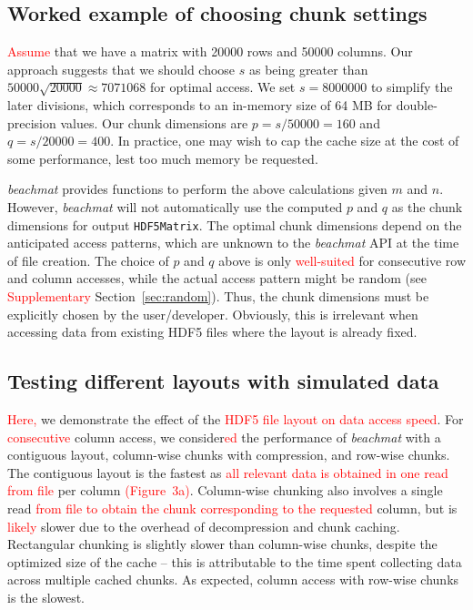 \documentclass{article}
\newcommand{\beachmat}{\textit{beachmat}}
\newcommand{\revised}[1]{\textcolor{red}{#1}}
\begin{document}
%

\subsection{Worked example of choosing chunk settings}
\revised{Assume} that we have a matrix with 20000 rows and 50000 columns.
Our approach suggests that we should choose $s$ as being greater than $50000\sqrt{20000} \approx 7071068$ for optimal access.
We set $s=8000000$ to simplify the later divisions, which corresponds to an in-memory size of 64 MB for double-precision values.
Our chunk dimensions are $p = s/50000 = 160$ and $q = s/20000 = 400$.
In practice, one may wish to cap the cache size at the cost of some performance, lest too much memory be requested.

\textit{beachmat} provides functions to perform the above calculations given $m$ and $n$.
However, \textit{beachmat} will not automatically use the computed $p$ and $q$ as the chunk dimensions for output \texttt{HDF5Matrix}.
The optimal chunk dimensions depend on the anticipated access patterns, which are unknown to the \textit{beachmat} API at the time of file creation.
The choice of $p$ and $q$ above is only \revised{well-suited} for consecutive row and column accesses, while the actual access pattern might be random (see \revised{Supplementary} Section~\ref{sec:random}).
Thus, the chunk dimensions must be explicitly chosen by the user/developer.
Obviously, this is irrelevant when accessing data from existing HDF5 files where the layout is already fixed.

\subsection{Testing different layouts with simulated data}
\revised{Here,} we demonstrate the effect of the \revised{HDF5 file layout on data access speed}.
For \revised{consecutive} column access, we consider\revised{ed} the performance of \beachmat{} with a contiguous layout, column-wise chunks with compression, and row-wise chunks.
The contiguous layout is the fastest as \revised{all relevant data is obtained in one read from file} per column \revised{(Figure~3a)}.
Column-wise chunking also involves a single read \revised{from file to obtain the chunk corresponding to the requested} column, but is \revised{likely} slower due to the overhead of decompression and chunk caching.
Rectangular chunking is slightly slower than column-wise chunks, despite the optimized size of the cache -- this is attributable to the time spent collecting data across multiple cached chunks.
As expected, column access with row-wise chunks is the slowest.
\end{document}
